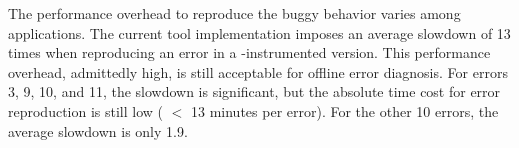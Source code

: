 The performance overhead to reproduce the buggy behavior varies
among applications. The current tool implementation
imposes an average slowdown of 13 times when reproducing
an error in a \ourtool-instrumented version.
This performance overhead, admittedly high, is still acceptable
for offline error diagnosis.
For errors 3, 9, 10, and 11, the slowdown is significant, but the
absolute time cost for error reproduction is still low ( $<$ 13 minutes per error).  
For the other 10 errors, the average slowdown is only 1.9.





